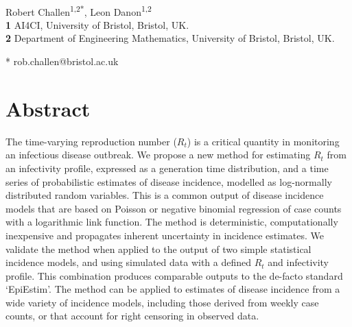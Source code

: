 \documentclass[10pt,letterpaper]{article}
\begin{document}
\vspace*{0.2in}

\begin{flushleft}
{\Large
\textbf{}
}
\newline
\\
Robert Challen\textsuperscript{1,2*},
Leon Danon\textsuperscript{1,2}
\\
\bigskip
\textbf{1} AI4CI, University of Bristol, Bristol, UK.\\
\textbf{2} Department of Engineering Mathematics, University of Bristol, Bristol, UK.\\
\bigskip

* rob.challen@bristol.ac.uk

\end{flushleft}
\section*{Abstract}

The time-varying reproduction number ($R_t$) is a critical quantity in monitoring an infectious disease outbreak. We propose a new method for estimating $R_t$ from an infectivity profile, expressed as a generation time distribution, and a time series of probabilistic estimates of disease incidence, modelled as log-normally distributed random variables. This is a common output of disease incidence models that are based on Poisson or negative binomial regression of case counts with a logarithmic link function. The method is deterministic, computationally inexpensive and propagates inherent uncertainty in incidence estimates. We validate the method when applied to the output of two simple statistical incidence models, and using simulated data with a defined $R_t$ and infectivity profile. This combination produces comparable outputs to the de-facto standard `EpiEstim'. The method can be applied to estimates of disease incidence from a wide variety of incidence models, including those derived from weekly case counts, or that account for right censoring in observed data. 
\end{document}
